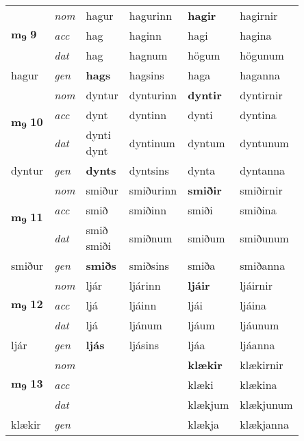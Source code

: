 \begin{longtable}[l]{X>{\footnotesize\itshape}XXXXX}
\multirow{3}{*}{{{\textbf{m{\textsubscript{9}}} \Large{\textbf{9}}}}} & nom & hagur & hagurinn & \textbf{hagir} & hagirnir \\*
 & acc & hag & haginn & hagi & hagina \\*
 & dat & hag & hagnum & högum & högunum \\*
 {\footnotesize{hagur}} & gen & \textbf{hags} & hagsins & haga & haganna \\
\cmidrule{1-6}

\multirow{3}{*}{{{\textbf{m{\textsubscript{9}}} \Large{\textbf{10}}}}} & nom & dyntur & dynturinn & \textbf{dyntir} & dyntirnir \\*
 & acc & dynt & dyntinn & dynti & dyntina \\*
 & dat & \specialcell{dynti\\ dynt} & dyntinum & dyntum & dyntunum \\*
 {\footnotesize{dyntur}} & gen & \textbf{dynts} & dyntsins & dynta & dyntanna \\
\cmidrule{1-6}

\multirow{3}{*}{{{\textbf{m{\textsubscript{9}}} \Large{\textbf{11}}}}} & nom & smiður & smiðurinn & \textbf{smiðir} & smiðirnir \\*
 & acc & smið & smiðinn & smiði & smiðina \\*
 & dat & \specialcell{smið\\ smiði} & smiðnum & smiðum & smiðunum \\*
 {\footnotesize{smiður}} & gen & \textbf{smiðs} & smiðsins & smiða & smiðanna \\


\multirow{3}{*}{{{\textbf{m{\textsubscript{9}}} \Large{\textbf{12}}}}} & nom & ljár & ljárinn & \textbf{ljáir} & ljáirnir \\*
 & acc & ljá & ljáinn & ljái & ljáina \\*
 & dat & ljá & ljánum & ljáum & ljáunum \\*
 {\footnotesize{ljár}} & gen & \textbf{ljás} & ljásins & ljáa & ljáanna \\
\cmidrule{1-6}

\multirow{3}{*}{{{\textbf{m{\textsubscript{9}}} \Large{\textbf{13}}}}} & nom &  &  & \textbf{klækir} & klækirnir \\*
 & acc &  &  & klæki & klækina \\*
 & dat &  &  & klækjum & klækjunum \\*
 {\footnotesize{klækir}} & gen & \textbf{} &  & klækja & klækjanna \\
\cmidrule{1-6}


\end{longtable}
